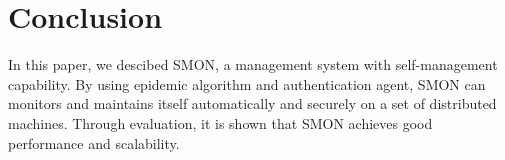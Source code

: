 \section{Conclusion}
\label{sec:conclusion}

In this paper, we descibed SMON, a management system with
self-management capability. By using epidemic algorithm and
authentication agent, SMON can monitors and maintains itself
automatically and securely on a set of distributed machines.
Through evaluation, it is shown that SMON achieves good
performance and scalability.

